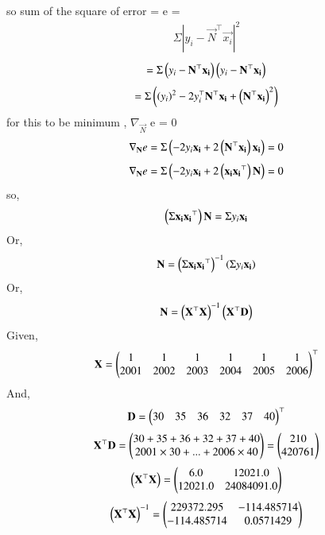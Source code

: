 \documentclass[journal,12pt,onecolumn]{IEEEtran}
\begin{document}
		so sum of the square of error = e =
		\begin{align}
				\Sigma|y_i - \vec{N}^\top\vec{x_i}|^2
		\end{align}
		\begin{align}
		=		\Sigma\left(y_i - \mathbf{N}^\top\mathbf{x_i}\right)\left(y_i - \mathbf{N}^\top\mathbf{x_i}\right)
		\end{align}
		\begin{align}
				=		\Sigma\left(\left(y_i\right)^2 - 2y_i^\top\mathbf{N}^\top\mathbf{x_i} + \left(\mathbf{N}^\top\mathbf{x_i}\right)^2\right)
		\end{align}
		for this to be minimum , $\nabla_\vec{N}$ e = 0
		\begin{align}
		\nabla_{\mathbf{N}} e=\Sigma\left(- 2y_i\mathbf{x_i} + 2\left(\mathbf{N}^\top\mathbf{x_i}\right)\mathbf{x_i}\right)=0
		\end{align}
		\begin{align}
		\nabla_{\mathbf{N}} e=\Sigma\left(- 2y_i\mathbf{x_i} + 2\left(\mathbf{x_i}\mathbf{x_i}^\top\right)\mathbf{N}\right)=0
		\end{align}
		so,
		\begin{align}
				\left(\Sigma\mathbf{x_i}\mathbf{x_i}^\top\right)\mathbf{N} = \Sigma y_i\mathbf{x_i}
		\end{align}Or,
		\begin{align}
				\mathbf{N} = \left(\Sigma\mathbf{x_i}\mathbf{x_i}^\top\right)^{-1}\left(\Sigma y_i\mathbf{x_i}\right)
		\end{align}Or,
		\begin{align}
				\mathbf{N} = \left(\mathbf{X}^\top\mathbf{X}\right)^{-1}\left(\mathbf{X}^\top\mathbf{D}\right)
		\end{align}
		Given,\begin{align}
		\mathbf{X} = \begin{pmatrix}1&1&1&1&1&1\\2001&2002&2003&2004&2005&2006\end{pmatrix}^\top
		\end{align}
		And,\begin{align}
		\mathbf{D} = \begin{pmatrix}30&35&36&32&37&40\end{pmatrix}^\top
		\end{align}
		\begin{align}
				\mathbf{X}^\top\mathbf{D} = \begin{pmatrix}30+35+36+32+37+40 \\ 2001\times30 + ... + 2006\times40\end{pmatrix} = \begin{pmatrix}210 \\ 420761\end{pmatrix}
		\end{align}
		\begin{align}
				\left(\mathbf{X}^\top\mathbf{X}\right) = \begin{pmatrix}6.0 & 12021.0 \\
12021.0 & 24084091.0\end{pmatrix}
		\end{align}
		\begin{align}
				\left(\mathbf{X}^\top\mathbf{X}\right)^{-1} = \begin{pmatrix}229372.295 & -114.485714 \\
-114.485714 & 0.0571429\end{pmatrix}
		\end{align}
\end{document}
